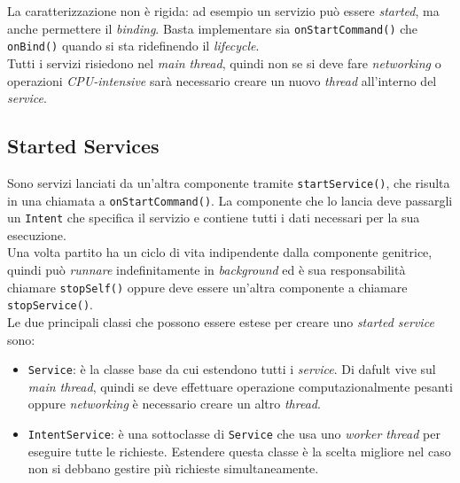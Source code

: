 \documentclass{book}
\begin{document}
La caratterizzazione non è rigida: ad esempio un servizio può essere \textit{started}, ma anche permettere il \textit{binding}. Basta implementare sia \texttt{onStartCommand()} che \texttt{onBind()} quando si sta ridefinendo il \textit{lifecycle}.\\
Tutti i servizi risiedono nel \textit{main thread}, quindi non se si deve fare \textit{networking} o operazioni \textit{CPU-intensive} sarà necessario creare un nuovo \textit{thread} all'interno del \textit{service}.


\subsection{Started Services}
Sono servizi lanciati da un'altra componente tramite \texttt{startService()}, che risulta in una chiamata a \texttt{onStartCommand()}. La componente che lo lancia deve passargli un \texttt{Intent} che specifica il servizio e contiene tutti i dati necessari per la sua esecuzione.\\
Una volta partito ha un ciclo di vita indipendente dalla componente genitrice, quindi può \textit{runnare} indefinitamente in \textit{background} ed è sua responsabilità chiamare \texttt{stopSelf()} oppure deve essere un'altra componente a chiamare \texttt{stopService()}.\\
Le due principali classi che possono essere estese per creare uno \textit{started service} sono:
\begin{itemize}
	\item \texttt{Service}: è la classe base da cui estendono tutti i \textit{service}. Di dafult vive sul \textit{main thread}, quindi se deve effettuare operazione computazionalmente pesanti oppure \textit{networking} è necessario creare un altro \textit{thread}.
	\item \texttt{IntentService}: è una sottoclasse di \texttt{Service} che usa uno \textit{worker thread} per eseguire tutte le richieste. Estendere questa classe è la scelta migliore nel caso non si debbano gestire più richieste simultaneamente.
\end{itemize}
\end{document}
